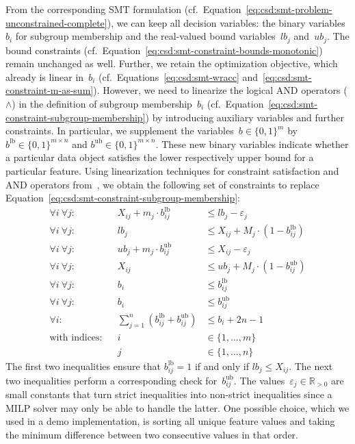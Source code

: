 \documentclass{article}
\theoremstyle{definition}
\begin{document}
From the corresponding SMT formulation (cf.~Equation~\ref{eq:csd:smt-problem-unconstrained-complete}), we can keep all decision variables:
the binary variables~$b_i$ for subgroup membership and the real-valued bound variables~$\mathit{lb}_j$ and~$\mathit{ub}_j$.
The bound constraints (cf.~Equation~\ref{eq:csd:smt-constraint-bounds-monotonic}) remain unchanged as well.
Further, we retain the optimization objective, which already is linear in~$b_i$ (cf.~Equations~\ref{eq:csd:smt-wracc} and~\ref{eq:csd:smt-constraint-m-as-sum}).
However, we need to linearize the logical AND operators ($\land$) in the definition of subgroup membership~$b_i$ (cf.~Equation~\ref{eq:csd:smt-constraint-subgroup-membership}) by introducing auxiliary variables and further constraints.
In particular, we supplement the variables~$b \in \{0, 1\}^m$ by $b^{\text{lb}} \in \{0, 1\}^{m \times n}$ and $b^{\text{ub}} \in \{0, 1\}^{m \times n}$.
These new binary variables indicate whether a particular data object satisfies the lower respectively upper bound for a particular feature.
Using linearization techniques for constraint satisfaction and AND operators from~\cite{mosek2022modeling}, we obtain the following set of constraints to replace Equation~\ref{eq:csd:smt-constraint-subgroup-membership}:
%
\begin{equation}
	\begin{aligned}
		\forall i~\forall j: & & X_{ij} + m_j \cdot b^{\text{lb}}_{ij} &\leq \mathit{lb}_j - \varepsilon_j \\
	 	\forall i~\forall j: & & \mathit{lb}_j &\leq X_{ij} + M_j \cdot \left(1 - b^{\text{lb}}_{ij} \right) \\
	 	\forall i~\forall j: & & \mathit{ub}_j + m_j \cdot b^{\text{ub}}_{ij} &\leq X_{ij} - \varepsilon_j \\
	 	\forall i~\forall j: & & X_{ij} &\leq \mathit{ub}_j + M_j \cdot \left(1 - b^{\text{ub}}_{ij} \right) \\
	 	\forall i~\forall j: & & b_i &\leq b^{\text{lb}}_{ij} \\
	 	\forall i~\forall j: & & b_i &\leq b^{\text{ub}}_{ij} \\
	 	\forall i: & & \sum_{j=1}^{n} \left( b^{\text{lb}}_{ij} + b^{\text{ub}}_{ij} \right) &\leq b_i + 2n - 1 \\
		\text{with indices:} & & i &\in \{1, \dots, m\} \\
		& & j &\in \{1, \dots, n\}
	\end{aligned}
	\label{eq:csd:milp-constraint-subgroup-membership}
\end{equation}
%
The first two inequalities ensure that $b^{\text{lb}}_{ij} = 1$ if and only if $\mathit{lb}_j \leq X_{ij}$.
The next two inequalities perform a corresponding check for~$b^{\text{ub}}_{ij}$.
The values~$\varepsilon_j \in \mathbb{R}_{> 0}$ are small constants that turn strict inequalities into non-strict inequalities since a MILP solver may only be able to handle the latter.
One possible choice, which we used in a demo implementation, is sorting all unique feature values and taking the minimum difference between two consecutive values in that order.
\end{document}
